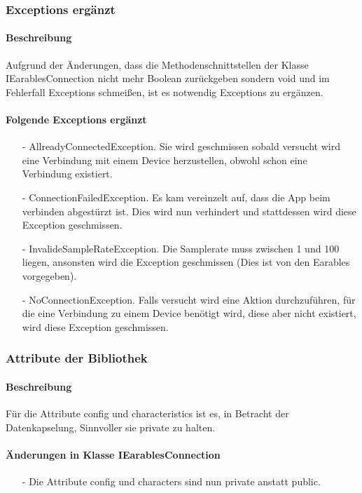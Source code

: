 \documentclass[a4paper,12pt]{article}
\begin{document}
\subsubsection{Exceptions ergänzt}
\paragraph{Beschreibung}
Aufgrund der Änderungen, dass die Methodenschnittstellen der Klasse IEarablesConnection nicht mehr Boolean zurückgeben sondern void und im Fehlerfall Exceptions schmeißen, ist es notwendig Exceptions zu ergänzen.
\paragraph{Folgende Exceptions ergänzt}
\begin{itemize}
	\item[-] AllreadyConnectedException. Sie wird geschmissen sobald versucht wird eine Verbindung mit einem Device herzustellen, obwohl schon eine Verbindung existiert.
	\item[-] ConnectionFailedException. Es kam vereinzelt auf, dass die App beim verbinden abgestürzt ist. Dies wird nun verhindert und stattdessen wird diese  Exception geschmissen.
	\item[-] InvalideSampleRateException. Die Samplerate muss zwischen 1 und 100 liegen, ansonsten wird die Exception geschmissen (Dies ist von den Earables vorgegeben).
	\item[-] NoConnectionException. Falls versucht wird eine Aktion durchzuführen, für die eine Verbindung zu einem Device benötigt wird, diese aber nicht existiert, wird diese Exception geschmissen.
\end{itemize}


\subsubsection{Attribute der Bibliothek}
\paragraph{Beschreibung}
Für die Attribute config und characteristics ist es, in Betracht der Datenkapselung, Sinnvoller sie private zu halten.
	\paragraph{Änderungen in Klasse IEarablesConnection}
\begin{itemize}
	\item[-] Die Attribute config und characters sind nun private anstatt public.
\end{itemize}
\end{document}
